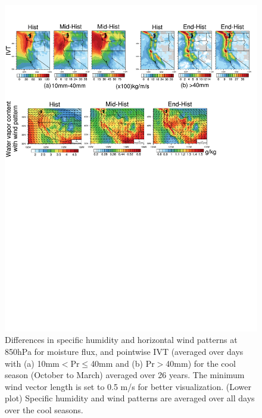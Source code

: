 \documentclass{ametsoc}
\begin{document}
\begin{figure}
\begin{center}
\includegraphics[width=6in]{discussion_indices.pdf}
\caption{Differences in specific humidity and horizontal wind patterns at 850hPa for moisture flux, and pointwise IVT (averaged over days with (a) 10mm$<$Pr$\leq$40mm and (b) Pr$>$40mm) for the cool season (October to March) averaged over 26 years. The minimum wind vector length is set to 0.5 m/s for better visualization. (Lower plot) Specific humidity and wind patterns are averaged over all days over the cool seasons.}
\label{fig:discussIndex}
\end{center}
\end{figure}
\end{document}

